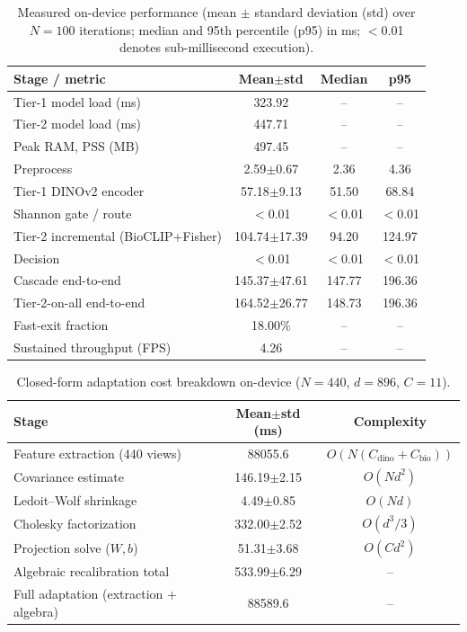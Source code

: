\documentclass[preprint,12pt]{elsarticle}
\begin{document}
\begin{table}[htbp]
\caption{Measured on-device performance (mean $\pm$ standard deviation (std) over $N=100$ iterations; median and 95th percentile (p95) in ms; $<$0.01 denotes sub-millisecond execution).}
\label{tab:device_perf}
\centering

\footnotesize
\begin{tabular}{lccc}
\toprule
Stage / metric & Mean$\pm$std & Median & p95 \\
\midrule
Tier-1 model load (ms) & 323.92 & -- & -- \\
Tier-2 model load (ms) & 447.71 & -- & -- \\
Peak RAM, PSS (MB) & 497.45 & -- & -- \\
\midrule
Preprocess & 2.59$\pm$0.67 & 2.36 & 4.36 \\
Tier-1 DINOv2 encoder & 57.18$\pm$9.13 & 51.50 & 68.84 \\
Shannon gate / route & $<$0.01 & $<$0.01 & $<$0.01 \\
Tier-2 incremental (BioCLIP+Fisher) & 104.74$\pm$17.39 & 94.20 & 124.97 \\
Decision & $<$0.01 & $<$0.01 & $<$0.01 \\
Cascade end-to-end & 145.37$\pm$47.61 & 147.77 & 196.36 \\
Tier-2-on-all end-to-end & 164.52$\pm$26.77 & 148.73 & 196.36 \\
\midrule
Fast-exit fraction & 18.00\% & -- & -- \\
Sustained throughput (FPS) & 4.26 & -- & -- \\
\bottomrule
\end{tabular}
\end{table}

\begin{table}[htbp]
\caption{Closed-form adaptation cost breakdown on-device ($N=440$, $d=896$, $C=11$).}
\label{tab:adaptation_breakdown}
\centering

\footnotesize
\begin{tabular}{lcc}
\toprule
Stage & Mean$\pm$std (ms) & Complexity \\
\midrule
Feature extraction (440 views) & 88055.6 & $O(N(C_{\text{dino}}+C_{\text{bio}}))$ \\
Covariance estimate & 146.19$\pm$2.15 & $O(Nd^2)$ \\
Ledoit--Wolf shrinkage & 4.49$\pm$0.85 & $O(Nd)$ \\
Cholesky factorization & 332.00$\pm$2.52 & $O(d^3/3)$ \\
Projection solve ($W,b$) & 51.31$\pm$3.68 & $O(Cd^2)$ \\
\midrule
Algebraic recalibration total & 533.99$\pm$6.29 & -- \\
Full adaptation (extraction + algebra) & 88589.6 & -- \\
\bottomrule
\end{tabular}
\end{table}
\end{document}
